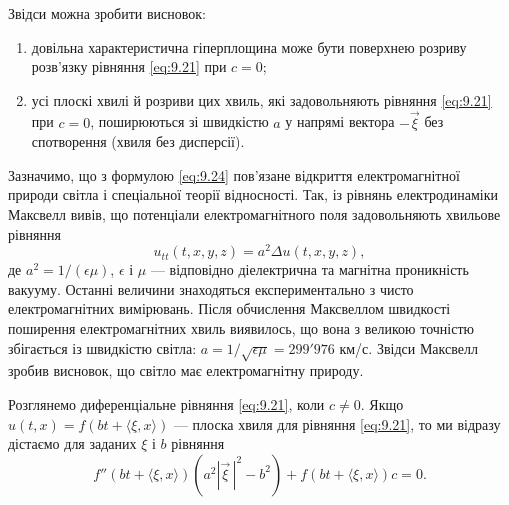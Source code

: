 Звідси можна зробити висновок:
\begin{enumerate}
    \item довільна характеристична гіперплощина може бути поверхнею розриву розв'язку рівняння \eqref{eq:9.21} при $c = 0$;
    \item усі плоскі хвилі й розриви цих хвиль, які задовольняють рівняння \eqref{eq:9.21} при $c = 0$, поширюються зі швидкістю $a$ у напрямі вектора $- \vec \xi$ без спотворення (хвиля без дисперсії).
\end{enumerate}

Зазначимо, що з формулою \eqref{eq:9.24} пов'язане відкриття електромагнітної природи світла і спеціальної теорії відносності. Так, із рівнянь електродинаміки Максвелл вивів, що потенціали електромагнітного поля задовольняють хвильове рівняння 
\begin{equation}
    u_{tt}(t, x, y, z) = a^2 \Delta u(t, x, y, z),
\end{equation}
де $a^2 = 1 / (\epsilon \mu)$, $\epsilon$ і $\mu$ --- відповідно діелектрична та магнітна проникність вакууму. Останні величини знаходяться експериментально з чисто електромагнітних вимірювань. Після обчислення Максвеллом швидкості поширення електромагнітних хвиль виявилось, що вона з великою точністю збігається із швидкістю світла: $a = 1 / \sqrt{\epsilon \mu} = 299'976$ км/с. Звідси Максвелл зробив висновок, що світло має електромагнітну природу. \medskip

Розглянемо диференціальне рівняння \eqref{eq:9.21}, коли $c \ne 0$. Якщо $u(t, x) = f (b t + \langle \xi, x \rangle)$ --- плоска хвиля для рівняння \eqref{eq:9.21}, то ми відразу дістаємо для заданих $\xi$ і $b$ рівняння 
\begin{equation}
    \label{eq:9.26}
    f''(bt+\langle \xi, x \rangle) \left( a^2 \left| \vec \xi \, \right|^2 - b^2 \right) + f(bt + \langle \xi, x \rangle) c = 0.
\end{equation}

